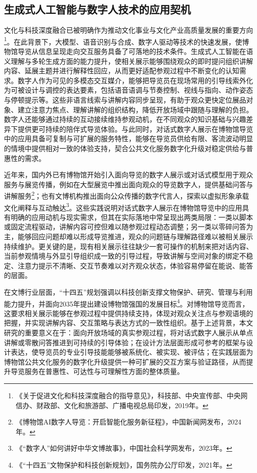\subsection{生成式人工智能与数字人技术的应用契机}
文化与科技深度融合已被明确作为推动文化事业与文化产业高质量发展的重要方向\footnote{《关于促进文化和科技深度融合的指导意见》，科技部、中央宣传部、中央网信办、财政部、文化和旅游部、广播电视总局印发，2019年。}。在此背景下，大模型、语音识别与合成、数字人驱动等技术的快速发展，使博物馆导览从信息呈现走向交互服务具备了可落地的技术条件。生成式人工智能在语义理解与多轮生成方面的能力提升，使相关展示能够围绕观众的即时提问组织讲解内容、延展主题并进行解释性回应，从而更好适配参观过程中不断变化的认知需求。数字人作为可见的多模态交互媒介，能够把导览员在现场常用的引导线索外化为可被设计与调控的表达要素，包括语音语调与节奏控制、视线与指向、动作姿态与停顿提示等。这些非语言线索与讲解内容同步呈现，有助于观众更快定位展品对象、建立注意力焦点、理解讲解的组织结构，降低开放场域中跟随与理解的负担。数字人还能够通过持续的互动接续维持参观动机，在不同观众的知识基础与兴趣差异下提供更可持续的陪伴式导览体验。与此同时，对话式数字人展示在博物馆导览中的应用具备可复制与可扩展的服务特性，能够在导览员供给有限、客流波动明显的情境中提供相对一致的体验支持，契合公共文化服务数字化升级对稳定供给与普惠性的需求。

近年来，国内外已有博物馆开始引入面向导览的数字人展示或对话式模型用于观众服务与展览传播，例如在大型展览中推出面向观众的导览数字人，提供基础问答与讲解服务\footnote{《博物馆AI数字人导览：开启智能化服务新征程》，中国新闻网发布，2024年。}；也有文博机构推出面向公众传播的数字代言人，探索以虚拟形象承载文化阐释与互动触达\footnote{《“数字人”如何讲好中华文博故事》，中国社会科学网发布，2023年。}。这些实践说明对话式数字人展示在博物馆导览中的应用具有明确的应用动机与现实需求，但其在实际落地中常呈现出两类局限：一类以脚本或固定流程驱动，讲解内容可控但难以随参观过程动态调整；另一类以零碎问答为主，能够回应问题却难以形成导览推进，观众的问题链与理解路径难以被相关展示持续维护。更关键的是，现有相关展示往往缺少一套可操作的机制来把对话内容、当前参观情境与外显引导组织成一致的引导过程，导致讲解与空间对象的绑定不稳定、注意力提示不清晰、交互节奏难以对齐观众状态，体验容易停留在能说、能答的层面。

在文博行业层面，“十四五”规划强调以科技创新支撑文物保护、研究、管理与利用能力提升，并面向2035年提出建设博物馆强国的发展目标\footnote{《“十四五”文物保护和科技创新规划》，国务院办公厅印发，2021年。}。对博物馆导览而言，这要求相关展示能够在参观过程中提供持续支持，体现对观众关注点与参观语境的把握，并实现讲解内容、交互策略与表达方式的一致性组织。基于上述背景，本文研究的重要意义在于：面向开放场域的真实参观过程，将对话式数字人展示从单点讲解或零散问答推进到可持续的引导体验；在设计方法层面形成可参考的框架与设计表达，使导览员的专业引导技能能够被系统化、被实现、被评估；在实践层面为博物馆公共文化服务的数字化升级提供一种可扩展的交互方案与验证路径，从而提升导览服务在普惠性、可达性与可理解性方面的整体质量。

